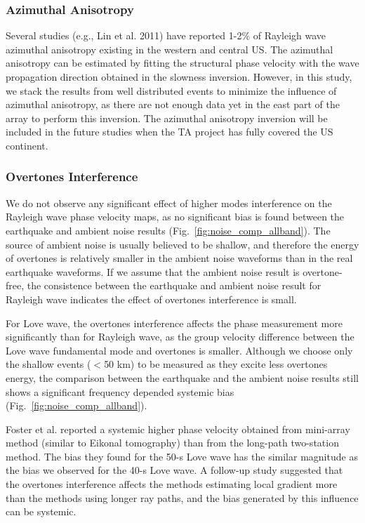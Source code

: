 \documentclass[referee]{gji}
\begin{document}
\subsubsection{Azimuthal Anisotropy}

Several studies (e.g., Lin et al. 2011) have reported 1-2\% of Rayleigh wave azimuthal anisotropy existing in the western and central US. The azimuthal anisotropy can be estimated by fitting the structural phase velocity with the wave propagation direction obtained in the slowness inversion. However, in this study, we stack the results from well distributed events to minimize the influence of azimuthal anisotropy, as there are not enough data yet in the east part of the array to perform this inversion. The azimuthal anisotropy inversion will be included in the future studies when the TA project has fully covered the US continent.

\subsubsection{Overtones Interference}
\label{sec:overtone}

We do not observe any significant effect of higher modes interference on the Rayleigh wave phase velocity maps, as no significant bias is found between the earthquake and ambient noise results (Fig.~\ref{fig:noise_comp_allband}). The source of ambient noise is usually believed to be shallow, and therefore the energy of overtones is relatively smaller in the ambient noise waveforms than in the real earthquake waveforms. If we assume that the ambient noise result is overtone-free, the consistence between the earthquake and ambient noise result for Rayleigh wave indicates the effect of overtones interference is small.

For Love wave, the overtones interference affects the phase measurement more significantly than for Rayleigh wave, as the group velocity difference between the Love wave fundamental mode and overtones is smaller. Although we choose only the shallow events ($<$50 km) to be measured as they excite less overtones energy, the comparison between the earthquake and the ambient noise results still shows a significant frequency depended systemic bias (Fig.~\ref{fig:noise_comp_allband}).

Foster et al.  reported a systemic higher phase velocity obtained from mini-array method (similar to Eikonal tomography) than from the long-path two-station method. The bias they found for the 50-s Love wave has the similar magnitude as the bias we observed for the 40-s Love wave. A follow-up study \cite{Foster:2014oi} suggested that the overtones interference affects the methods estimating local gradient more than the methods using longer ray paths, and the bias generated by this influence can be systemic.
\end{document}
